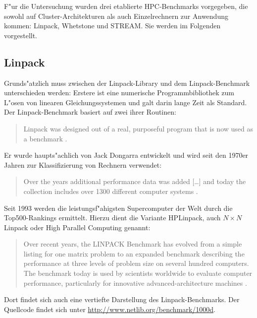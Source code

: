 F"ur die Untersuchung wurden drei etablierte HPC-Benchmarks vorgegeben, die sowohl auf Cluster-Architekturen als auch Einzelrechnern zur Anwendung kommen: Linpack, Whetstone und STREAM. Sie werden im Folgenden vorgestellt. 

\subsection{Linpack}\label{Linpack}

Grunds"atzlich muss zwischen der Linpack-Library und dem Linpack-Benchmark unterschieden werden: Erstere ist eine numerische Programmbibliothek zum L"osen von linearen Gleichungssystemen und galt darin lange Zeit als Standard. Der Linpack-Benchmark basiert auf zwei ihrer Routinen: 
\begin{quote}
\onehalfspacing
Linpack was designed out of a real, purposeful program that is now used as a benchmark \cite{wei90}. 
\end{quote}
Er wurde haupts"achlich von Jack Dongarra entwickelt und wird seit den 1970er Jahren zur Klassifizierung von Rechnern verwendet: 
\begin{quote}
\onehalfspacing
Over the years additional performance data was added [\dots] and today the collection includes over 1300 different computer systems \cite{don03}.
\end{quote}
Seit 1993 werden die leistungsf"ahigsten Supercomputer der Welt durch die Top500-Rankings ermittelt. Hierzu dient die Variante HPLinpack, auch $N\times N$ Linpack oder High Parallel Computing genannt:  
\begin{quote}
\onehalfspacing
Over recent years, the LINPACK Benchmark has evolved from a simple listing for one matrix problem to an expanded benchmark describing the performance at three levels of problem size on several hundred computers. The benchmark today is used by scientists worldwide to evaluate computer performance, particularly for innovative advanced-architecture machines \cite{don03}. 
\end{quote}
Dort findet sich auch eine vertiefte Darstellung des Linpack-Benchmarks. Der Quellcode findet sich unter \url{http://www.netlib.org/benchmark/1000d}.

